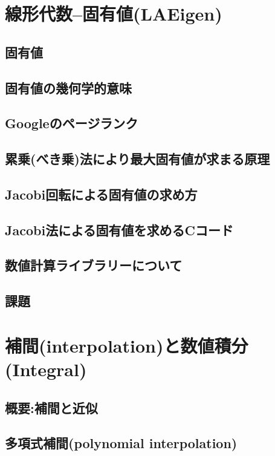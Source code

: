 \chapter{線形代数--固有値(LAEigen)}
\section{固有値}
 
\section{固有値の幾何学的意味}
 
\section{Googleのページランク}
 
\section{累乗(べき乗)法により最大固有値が求まる原理}
 
\section{Jacobi回転による固有値の求め方}
 
\section{Jacobi法による固有値を求めるCコード}
 
\section{数値計算ライブラリーについて}
 
\section{課題}
 
\chapter{補間(interpolation)と数値積分(Integral)}
\section{概要:補間と近似}
 
\section{多項式補間(polynomial interpolation)}
 
